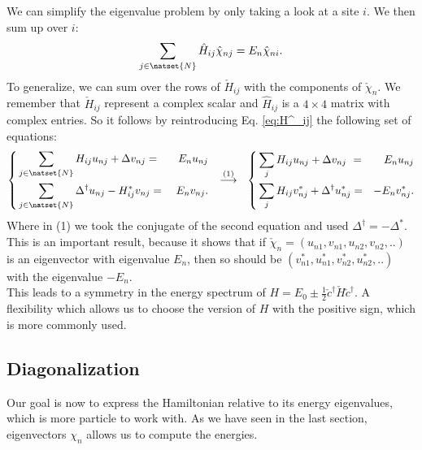 \documentclass[../main.tex]{subfile}
\begin{document}
We can simplify the eigenvalue problem by only taking a look at a site $i$. We then sum up over $i$: 
\[
    \sum_{j\in\natset{N}}\hat{H}_{ij} \hat{\chi}_{nj} = E_n \hat{\chi}_{ni}.
\]
To generalize, we can sum over the rows of $\check{H}_{ij}$ with the components of $\check{\chi}_n$.
We remember that $\check{H}_{ij}$ represent a complex scalar and $\hat{H}_{ij}$ is a $4\times4$ matrix with complex entries.
 So it follows by reintroducing Eq. \ref{eq:H^_ij} the following set of equations:
\begin{equation}
    \left\{
    \begin{aligned}
        &\sum_{j\in\natset{N}}H_{ij} u_{nj} + \Delta v_{nj} = &E_n u_{nj}\\
        &\sum_{j\in\natset{N}}\Delta^{\dagger} u_{nj} - H_{ij}^{\ast} v_{nj} =~& E_n v_{nj}.
    \end{aligned}
    \right.~~
    \stackrel{(1)}{\longrightarrow}~~
    \left\{
        \begin{aligned}
            &\sum_{j} H_{ij} u_{nj} + \Delta v_{nj} ~=& E_n u_{nj}\\
            &\sum_{j} H_{ij} v_{nj}^{\ast} + \Delta^{\dagger} u_{nj}^{\ast}= &-E_n v_{nj}^{\ast}.
        \end{aligned}
        \right.
\end{equation}
Where in (1) we took the conjugate of the second equation and used $\Delta^{\dagger} = -\Delta^{\ast}$.
This is an important result, because it shows that if $\check{\chi}_n = (u_{n1}, v_{n1},u_{n2}, v_{n2},.. )$ 
is an eigenvector with eigenvalue $E_n$, then  
so should be $(v_{n1}^{\ast}, u_{n1}^{\ast},v_{n2}^{\ast}, u_{n2}^{\ast},.. )$ with the eigenvalue $-E_n$.\\

This leads to a symmetry in the energy spectrum of $H = E_0 \pm \frac{1}{2}\check{c}^{\dagger}\check{H}\check{c}^{\dagger}$.
A flexibility which allows us to choose the version of $H$ with the positive sign, which is more commonly used.\\

\subsection{Diagonalization} \label{sec:Diagonalization}
Our goal is now to express the Hamiltonian relative to its energy eigenvalues, which is more particle to work with.
As we have seen in the last section, eigenvectors $\chi_n$ allows us to compute the energies.\\
\end{document}
